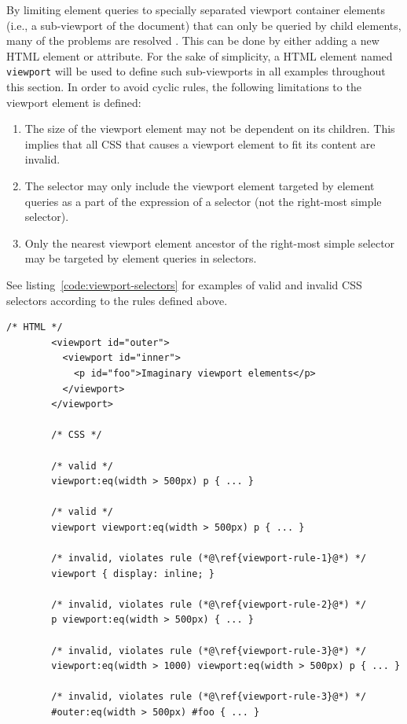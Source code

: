 \documentclass[a4paper,11pt]{kth-mag}
\newcommand{\code}[1]{\texttt{#1}}
\begin{document}
      By limiting element queries to specially separated \gls{viewport} container \glspl{element} (i.e., a sub-\gls{viewport} of the \gls{document}) that can only be queried by child \glspl{element}, many of the problems are resolved \cite{w3c_eq_mail,ricg_irc_log,ricg_issue_viewport}.
      This can be done by either adding a new \gls{HTML} element or attribute.
      For the sake of simplicity, a \gls{HTML} element named \code{viewport} will be used to define such sub-\glspl{viewport} in all examples throughout this section.
      In order to avoid cyclic rules, the following limitations to the \gls{viewport} element is defined:
      \begin{enumerate}
        \item\label{viewport-rule-1} The size of the \gls{viewport} element may not be dependent on its children. This implies that all \gls{CSS} that causes a \gls{viewport} \gls{element} to fit its content are invalid.
        \item\label{viewport-rule-2} The selector may only include the \gls{viewport} \gls{element} targeted by element queries as a part of the expression of a selector (not the right-most simple selector).
        \item\label{viewport-rule-3} Only the nearest \gls{viewport} element ancestor of the right-most simple selector may be targeted by element queries in selectors.
      \end{enumerate}
      See listing~\ref{code:viewport-selectors} for examples of valid and invalid CSS selectors according to the rules defined above.
      \begin{lstlisting}[gobble=8,caption={Examples of valid and invalid selectors with the \gls{viewport} \gls{element}.}, captionpos=b, label={code:viewport-selectors}]
        /* HTML */
        <viewport id="outer">
          <viewport id="inner">
            <p id="foo">Imaginary viewport elements</p>
          </viewport>
        </viewport>

        /* CSS */

        /* valid */
        viewport:eq(width > 500px) p { ... }

        /* valid */
        viewport viewport:eq(width > 500px) p { ... }

        /* invalid, violates rule (*@\ref{viewport-rule-1}@*) */
        viewport { display: inline; }

        /* invalid, violates rule (*@\ref{viewport-rule-2}@*) */
        p viewport:eq(width > 500px) { ... }

        /* invalid, violates rule (*@\ref{viewport-rule-3}@*) */
        viewport:eq(width > 1000) viewport:eq(width > 500px) p { ... }

        /* invalid, violates rule (*@\ref{viewport-rule-3}@*) */
        #outer:eq(width > 500px) #foo { ... }
      \end{lstlisting}
\end{document}
